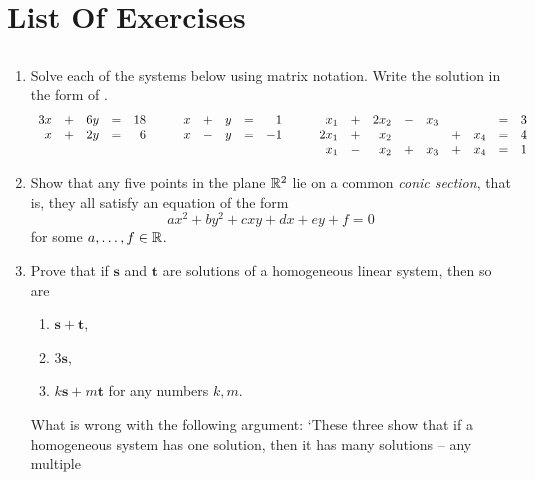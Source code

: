 \chapter*{List Of Exercises}

\section*{}

\begin{enumerate}
 \item Solve each of the systems below using matrix notation. Write the solution
  in the form of .
  \[
   \begin{array}[t]{r c r c r}
    3x & + & 6y & = & 18\\
    x & + & 2y & = & 6
   \end{array} \hspace{2em}
   \begin{array}[t]{r c r c r}
    x & + & y & = & 1\\
    x & - & y & = & -1
   \end{array} \hspace{2em}
   \begin{array}[t]{r c r c r c r c r}
    x_1 & + & 2x_2 & - & x_3 & & & = & 3\\
    2x_1 & + & x_2 & & & + & x_4 & = & 4\\
    x_1 & - & x_2 & + & x_3 & + & x_4 & = & 1
   \end{array}
  \]
 \item Show that any five points in the plane $\mathbb{R}^2$ lie on a common \emph{conic
  section}, that is, they all satisfy an equation of the form
  \[
   ax^2 + by^2 + cxy + dx + ey + f = 0
  \]
  for some $a,\ldots,f \in \mathbb{R}$.
 \item 
 Prove that if $\mathbf{s}$ and $\mathbf{t}$ are solutions of a homogeneous
 linear system, then so are
 \begin{enumerate}
  \item $\mathbf{s} + \mathbf{t}$,
  \item $3 \mathbf{s}$,
  \item $k \mathbf{s} + m \mathbf{t}$ for any numbers $k,m$.
 \end{enumerate}
 What is wrong with the following argument: `These three show that if a
 homogeneous system has one solution, then it has many solutions -- any multiple

\end{enumerate}
